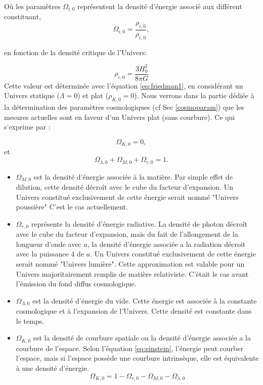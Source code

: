 Où les paramètres $\Omega_{i,0}$ représentent la densité d'énergie associé aux différent constituant, 
\begin{equation}
 \Omega_{i,0} = \frac{\rho_{i,0}}{\rho_{c,0}},
 \end{equation}

en fonction de la densité critique de l'Univers:

\begin{equation}
\rho_{c,0} = \frac{3H_0^2}{8\pi G}
 \end{equation}
Cette valeur est déterminée avec l'équation \ref{eq:friedman1}, en considérant un Univers statique ($\Lambda=0$) et plat ($\rho_{K,0}=0$).
Nous verrons dans la partie dédiée à la détermination des paramètres cosmologiques (cf Sec \ref{cosmoparam}) que les mesures actuelles sont en faveur d'un Univers plat (sans courbure).
Ce qui s'exprime par :

\begin{equation}
\Omega_{K,0} = 0,
\end{equation}
et
\begin{equation}
\Omega_{\lambda,0} +  \Omega_{M,0} + \Omega_{r,0} =1.
\end{equation}

\begin{itemize}
\item $\Omega_{M,0}$ est la densité d'énergie associée à la matière. %
Par simple effet de dilution, cette densité décroît avec le cube du facteur d'expansion.
Un Univers constitué exclusivement de cette énergie serait nommé "Univers poussière"
C'est le cas actuellement.

\item $\Omega_{r,0}$ représente la densité d'énergie radiative.
La densité de photon décroît avec le cube du facteur d'expansion, mais du fait de l'allongement de la longueur d'onde avec $a$, la densité d'énergie associée a la radiation décroit avec la puissance $4$ de $a$.
Un Univers constitué exclusivement de cette énergie serait nommé "Univers lumière".
Cette approximation est valable pour un Univers majoritairement remplis de matière relativiste.
C'était le cas avant l’émission du fond diffus cosmologique.

\item $\Omega_{\Lambda,0}$ est la densité d’énergie du vide.
Cette énergie est associée à la constante cosmologique et à l'expansion de l'Univers. 
Cette densité est constante dans le temps.

\item $\Omega_{K,0}$ est la densité de courbure spatiale ou la densité d'énergie associée a la courbure de l'espace.
Selon l’équation \ref{eq:einstein}, l'énergie peut courber l'espace, mais si l'espace possède une courbure intrinsèque, elle est équivalente à une densité d'énergie.
\begin{equation}
\Omega_{K,0} = 1 - \Omega_{r,0} - \Omega_{M,0} - \Omega_{\lambda,0} 
\end{equation}

\end{itemize}

